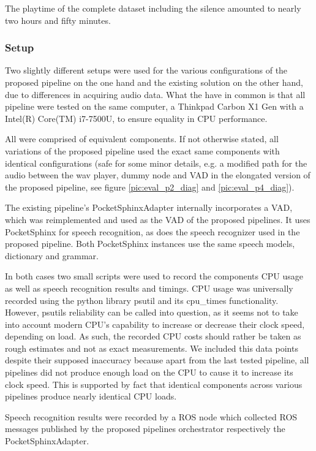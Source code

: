 The playtime of the complete dataset including the silence amounted to nearly two hours and fifty minutes.

\subsubsection{Setup}

Two slightly different setups were used for the various configurations of the proposed pipeline on the one hand and the existing solution on the other hand, due to differences in acquiring audio data.
What the have in common is that all pipeline were tested on the same computer, a Thinkpad Carbon X1 Gen with a Intel(R) Core(TM) i7-7500U, to ensure equality in CPU performance.

All were comprised of equivalent components. 
If not otherwise stated, all variations of the proposed pipeline used the exact same components with identical configurations (safe for some minor details, e.g. a modified path for the audio between the wav player, dummy node and VAD in the elongated version of the proposed pipeline, see figure \ref{pic:eval_p2_diag} and \ref{pic:eval_p4_diag}).

The existing pipeline's PocketSphinxAdapter internally incorporates a VAD, which was reimplemented and used as the VAD of the proposed pipelines.
It uses PocketSphinx for speech recognition, as does the speech recognizer used in the proposed pipeline. 
Both PocketSphinx instances use the same speech models, dictionary and grammar.

In both cases two small scripts were used to record the components CPU usage as well as speech recognition results and timings.
CPU usage was universally recorded using the python library psutil and its cpu\_times functionality.
However, psutils reliability can be called into question, as it seems not to take into account modern CPU's capability to increase or decrease their clock speed, depending on load.
As such, the recorded CPU costs should rather be taken as rough estimates and not as exact measurements.
We included this data points despite their supposed inaccuracy because apart from the last tested pipeline, all pipelines did not produce enough load on the CPU to cause it to increase its clock speed.
This is supported by fact that identical components across various pipelines produce nearly identical CPU loads.

Speech recognition results were recorded by a ROS node which collected ROS messages published by the proposed pipelines orchestrator respectively the PocketSphinxAdapter.


